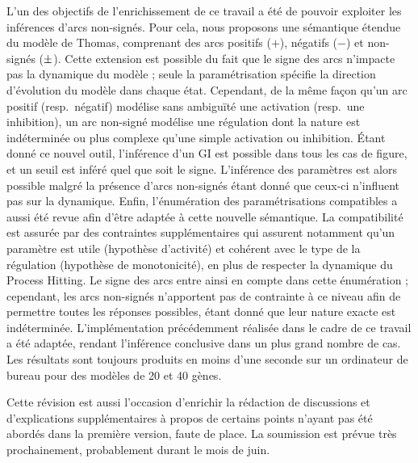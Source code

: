 L'un des objectifs de l'enrichissement de ce travail a été de pouvoir exploiter les inférences d'arcs non-signés.
Pour cela, nous proposons une sémantique étendue du modèle de Thomas, comprenant des arcs positifs ($+$), négatifs ($-$) et non-signés ($\pm$).
Cette extension est possible du fait que le signe des arcs n'impacte pas la dynamique du modèle ; seule la paramétrisation spécifie la direction d'évolution du modèle dans chaque état.
Cependant, de la même façon qu'un arc positif (resp.~négatif) modélise sans ambiguïté une activation (resp.~une inhibition),
un arc non-signé modélise une régulation dont la nature est indéterminée ou plus complexe qu'une simple activation ou inhibition.
Étant donné ce nouvel outil, l'inférence d'un GI est possible dans tous les cas de figure, et un seuil est inféré quel que soit le signe.
L'inférence des paramètres est alors possible malgré la présence d'arcs non-signés étant donné que ceux-ci n'influent pas sur la dynamique.
Enfin, l'énumération des paramétrisations compatibles a aussi été revue afin d'être adaptée à cette nouvelle sémantique.
La compatibilité est assurée par des contraintes supplémentaires qui assurent notamment qu'un paramètre est utile (hypothèse d'activité) et cohérent avec le type de la régulation (hypothèse de monotonicité), en plus de respecter la dynamique du Process Hitting.
Le signe des arcs entre ainsi en compte dans cette énumération ;
cependant, les arcs non-signés n'apportent pas de contrainte à ce niveau afin de permettre toutes les réponses possibles, étant donné que leur nature exacte est indéterminée.
L'implémentation précédemment réalisée dans le cadre de ce travail a été adaptée, rendant l'inférence conclusive dans un plus grand nombre de cas.
Les résultats sont toujours produits en moins d'une seconde sur un ordinateur de bureau pour des modèles de 20 et 40 gènes.

Cette révision est aussi l'occasion d'enrichir la rédaction de discussions et d'explications supplémentaires à propos de certains points n'ayant pas été abordés dans la première version, faute de place.
La soumission est prévue très prochainement, probablement durant le mois de juin.

